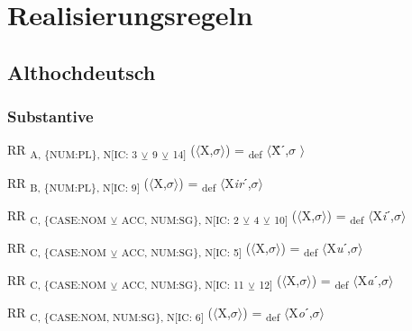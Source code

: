 \chapter{Realisierungsregeln}\label{appendix2}
\section{Althochdeutsch}
\subsection{Substantive}
{\raggedright
\begin{exe}
 RR \textsubscript{A, \{NUM:PL\}, N[IC: 3} \textsubscript{${\veebar}$}\textsubscript{ 9} \textsubscript{${\veebar}$}\textsubscript{ 14]} ($\langle$X,$\sigma $$\rangle$) = \textsubscript{def} $\langle$Ẍˊ,$\sigma $ $\rangle$
\end{exe}

\begin{exe}
 RR \textsubscript{B, \{NUM:PL\}, N[IC: 9]} ($\langle$X,$\sigma $$\rangle$) = \textsubscript{def} $\langle$X\textit{ir}ˊ,$\sigma $$\rangle$
\end{exe}

\begin{exe}
 RR \textsubscript{C, \{CASE:NOM} \textsubscript{${\veebar}$}\textsubscript{ ACC, NUM:SG\}, N[IC: 2} \textsubscript{${\veebar}$}\textsubscript{ 4} \textsubscript{${\veebar}$}\textsubscript{ 10]} ($\langle$X,$\sigma $$\rangle$) = \textsubscript{def} $\langle$X\textit{i}ˊ,$\sigma $$\rangle$
\end{exe}

\begin{exe}
 RR \textsubscript{C, \{CASE:NOM} \textsubscript{${\veebar}$}\textsubscript{ ACC, NUM:SG\}, N[IC: 5]} ($\langle$X,$\sigma $$\rangle$) = \textsubscript{def} $\langle$X\textit{u}ˊ,$\sigma $$\rangle$
\end{exe}

\begin{exe}
 RR \textsubscript{C, \{CASE:NOM} \textsubscript{${\veebar}$}\textsubscript{ ACC, NUM:SG\}, N[IC: 11} \textsubscript{${\veebar}$}\textsubscript{ 12]} ($\langle$X,$\sigma $$\rangle$) = \textsubscript{def} $\langle$X\textit{a}ˊ,$\sigma $$\rangle$
\end{exe}

\begin{exe}
 RR \textsubscript{C, \{CASE:NOM, NUM:SG\}, N[IC: 6]} ($\langle$X,$\sigma $$\rangle$) = \textsubscript{def} $\langle$X\textit{o}ˊ,$\sigma $$\rangle$
\end{exe}

}
